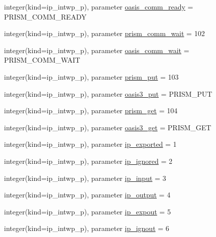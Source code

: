 \begin{DoxyCompactItemize}
\item 
integer(kind=ip\+\_\+intwp\+\_\+p), parameter \hyperlink{classmod__oasis__parameters_a8484e196ef7469adbeaef850787d7502}{oasis\+\_\+comm\+\_\+ready} = P\+R\+I\+S\+M\+\_\+\+C\+O\+M\+M\+\_\+\+R\+E\+A\+D\+Y
\item 
integer(kind=ip\+\_\+intwp\+\_\+p), parameter \hyperlink{classmod__oasis__parameters_a3d0349d8815bf1848122d99993097842}{prism\+\_\+comm\+\_\+wait} = 102
\item 
integer(kind=ip\+\_\+intwp\+\_\+p), parameter \hyperlink{classmod__oasis__parameters_a9df795bd9123857642aae31661b6c13a}{oasis\+\_\+comm\+\_\+wait} = P\+R\+I\+S\+M\+\_\+\+C\+O\+M\+M\+\_\+\+W\+A\+I\+T
\item 
integer(kind=ip\+\_\+intwp\+\_\+p), parameter \hyperlink{classmod__oasis__parameters_ad8db79b2d411e8f04445dcc2ed619548}{prism\+\_\+put} = 103
\item 
integer(kind=ip\+\_\+intwp\+\_\+p), parameter \hyperlink{classmod__oasis__parameters_a325334a5e2f9d0c7846c1ef964f9f7e3}{oasis3\+\_\+put} = P\+R\+I\+S\+M\+\_\+\+P\+U\+T
\item 
integer(kind=ip\+\_\+intwp\+\_\+p), parameter \hyperlink{classmod__oasis__parameters_a136a476f2771e33d12e42b47eef72f9b}{prism\+\_\+get} = 104
\item 
integer(kind=ip\+\_\+intwp\+\_\+p), parameter \hyperlink{classmod__oasis__parameters_aa2ac99363b8f1aa7ff950fda3e3f5fff}{oasis3\+\_\+get} = P\+R\+I\+S\+M\+\_\+\+G\+E\+T
\item 
integer(kind=ip\+\_\+intwp\+\_\+p), parameter \hyperlink{classmod__oasis__parameters_a0f729cda95773cdc8df800eacdceb606}{ip\+\_\+exported} = 1
\item 
integer(kind=ip\+\_\+intwp\+\_\+p), parameter \hyperlink{classmod__oasis__parameters_ae3733a399c07b165b5ad19543ca1d2a2}{ip\+\_\+ignored} = 2
\item 
integer(kind=ip\+\_\+intwp\+\_\+p), parameter \hyperlink{classmod__oasis__parameters_a6a7bcd0e3a33573729f94098ecd9a922}{ip\+\_\+input} = 3
\item 
integer(kind=ip\+\_\+intwp\+\_\+p), parameter \hyperlink{classmod__oasis__parameters_a556f148d126d8d6dfe711656024436e6}{ip\+\_\+output} = 4
\item 
integer(kind=ip\+\_\+intwp\+\_\+p), parameter \hyperlink{classmod__oasis__parameters_ae91d5161b091e1f07e6ee64a38514df6}{ip\+\_\+expout} = 5
\item 
integer(kind=ip\+\_\+intwp\+\_\+p), parameter \hyperlink{classmod__oasis__parameters_a4d283e27ebb49e8d97a35842f10d9aec}{ip\+\_\+ignout} = 6

\end{DoxyCompactItemize}
